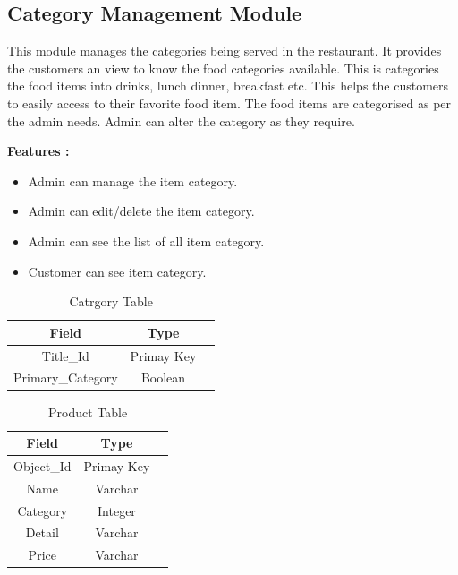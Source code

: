 \documentclass[12pt,a4paper]{report}
\begin{document}
\subsection{Category Management Module }
\hspace{0.25cm}
\par
This module manages the categories being served in the restaurant. It provides the customers an view to know the food categories available. This is categories the food items into drinks, lunch dinner, breakfast etc. This helps the customers to easily access to their favorite food item. The food items are categorised as per the admin needs. Admin can alter the category as they require. 

\textbf{Features :}
\begin{itemize}
	\item Admin can manage the item category.
	\item Admin can edit/delete the item category.
	\item Admin can see the list of all item category.
	\item Customer can see item category.
\end{itemize}

\begin{table}
  \begin{center}
    \begin{tabular}{ |c|c|c| } 
    \hline
    Field & Type  \\
    \hline
    Title\_Id & Primay Key \\
    \hline
    Primary\_Category & Boolean \\
    \hline
    \end{tabular}
    \caption{ Catrgory Table }
    \end{center}
  \end{table}

  \begin{table}
    \begin{center}
      \begin{tabular}{ |c|c|c| } 
      \hline
      Field & Type  \\
      \hline
      Object\_Id & Primay Key \\
      \hline
      Name & Varchar \\
      \hline
      Category & Integer \\
      \hline
      Detail & Varchar \\
      \hline
      Price & Varchar \\
      \hline
      \end{tabular}
      \caption{ Product Table }
      \end{center}
    \end{table}
\end{document}
